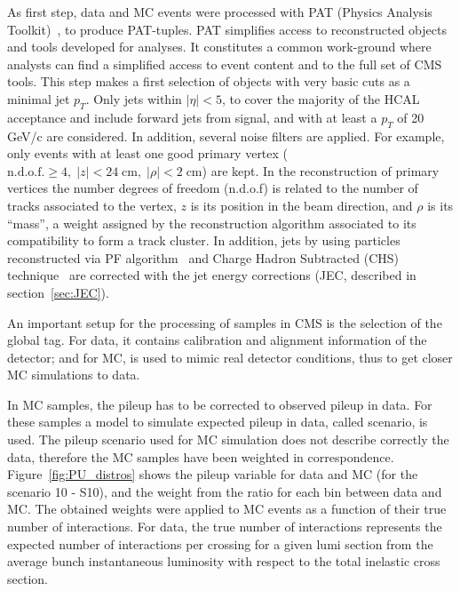 As first step, data and MC events were processed with PAT (Physics Analysis Toolkit)~\cite{Adam:2010zza}, to produce PAT-tuples. PAT simplifies access to reconstructed objects and tools developed for analyses. It constitutes a common work-ground where analysts can find a simplified access to event content and to the full set of CMS tools. This step makes a first selection of objects with very basic cuts as a minimal jet $p_{T}$. Only jets within $|\eta|<5$, to cover the majority of the HCAL acceptance and include forward jets from signal, and with at least a $p_{T}$ of 20 GeV/c are considered. In addition, several noise filters are applied. For example, only events with at least one good primary vertex ($\text{n.d.o.f.} \ge 4,\; |z|<24 \;\text{cm},\; |\rho|< 2 \;\text{cm}$) are kept. In the reconstruction of primary vertices the number degrees of freedom (n.d.o.f) is related to the number of tracks associated to the vertex, $z$ is its position in the beam direction, and $\rho$ is its ``mass'', a weight assigned by the reconstruction algorithm associated to its compatibility to form a track cluster. In addition, jets by using particles reconstructed via PF algorithm~\cite{CMS:2009nxa,CMS:2010eua,CMS:2010byl,CMS:2010aua} and Charge Hadron Subtracted (CHS) technique~\cite{Kirschenmann:1627818} are corrected with the jet energy corrections (JEC, described in section~\ref{sec:JEC}). %

An important setup for the processing of samples in CMS is the selection of the global tag. For data, it contains calibration and alignment information of the detector; and for MC, is used to mimic real detector conditions, thus to get closer MC simulations to data.

In MC samples, the pileup has to be corrected to observed pileup in data. For these samples a model to simulate expected pileup in data, called scenario, is used. The pileup scenario used for MC simulation does not describe correctly the data, therefore the MC samples have been weighted in correspondence. Figure~\ref{fig:PU_distros} shows the pileup variable for data and MC (for the scenario 10 - S10), and the weight from the ratio for each bin between data and MC. The obtained weights were applied to MC events as a function of their true number of interactions. For data, the true number of interactions represents the expected number of interactions per crossing for a given lumi section from the average bunch instantaneous luminosity with respect to the total inelastic cross section.


